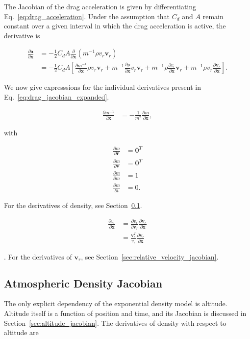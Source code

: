 \documentclass[]{article}
\newcommand{\vb}[1]{\bm{#1}} %
\newcommand{\pd}[2]{\frac{\partial #1}{\partial #2}} %
\begin{document}
The Jacobian of the drag acceleration is given by differentiating Eq.~\eqref{eq:drag_acceleration}. Under the assumption that $C_d$ and $A$ remain constant over a given interval in which the drag acceleration is active, the derivative is

\begin{align}
	\pd{\vb{a}}{\vb{x}} &= - \frac{1}{2} C_d A \pd{}{\vb{x}} \left( m^{-1} \rho v_r \vb{v}_r \right) \\
	\label{eq:drag_jacobian_expanded}
	&= - \frac{1}{2} C_d A \left[ \pd{m^{-1}}{\vb{x}} \rho v_r \vb{v}_r + m^{-1} \pd{\rho}{\vb{x}} v_r \vb{v}_r + m^{-1} \rho \pd{v_r}{\vb{x}} \vb{v}_r + m^{-1} \rho v_r \pd{\vb{v}_r}{\vb{x}} \right].
\end{align}

We now give expresssions for the individual derivatives present in Eq.~\eqref{eq:drag_jacobian_expanded}.

\begin{align}
	\pd{m^{-1}}{\vb{x}} &= -\frac{1}{m^2} \pd{m}{\vb{x}},
\end{align}

\noindent with

\begin{align}
	\pd{m}{\vb{r}} &= \vb{0}^T \\
	\pd{m}{\vb{v}} &= \vb{0}^T \\
	\pd{m}{m} &= 1 \\
	\pd{m}{t} &= 0.
\end{align}

For the derivatives of density, see Section~\ref{sec:atmospheric_density_jacobian}.

\begin{align}
	\pd{v_r}{\vb{x}} &= \pd{v_r}{\vb{v}_r} \pd{\vb{v}_r}{\vb{x}} \\
	&= \frac{\vb{v}_r^T}{v_r} \pd{\vb{v}_r}{\vb{x}}
\end{align}

\noindent. For the derivatives of $\vb{v}_r$, see Section~\ref{sec:relative_velocity_jacobian}.

\subsection{Atmospheric Density Jacobian}
\label{sec:atmospheric_density_jacobian}

The only explicit dependency of the exponential density model is altitude. Altitude itself is a function of position and time, and its Jacobian is discussed in Section~\ref{sec:altitude_jacobian}. The derivatives of density with respect to altitude are
\end{document}
